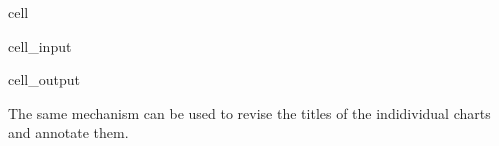 \documentclass[letterpaper,10pt,english]{jupyterBook}
\begin{document}
\begin{sphinxuseclass}{cell}\begin{sphinxVerbatimInput}

\begin{sphinxuseclass}{cell_input}
\begin{sphinxVerbatim}[commandchars=\\\{\}]
\PYG{p}{[}\PYG{p}{]}
\end{sphinxVerbatim}

\end{sphinxuseclass}\end{sphinxVerbatimInput}
\begin{sphinxVerbatimOutput}

\begin{sphinxuseclass}{cell_output}
\noindent{}

\end{sphinxuseclass}\end{sphinxVerbatimOutput}

\end{sphinxuseclass}
\sphinxAtStartPar
The same mechanism can be used to revise the titles of the indidividual charts and annotate them.
\end{document}
